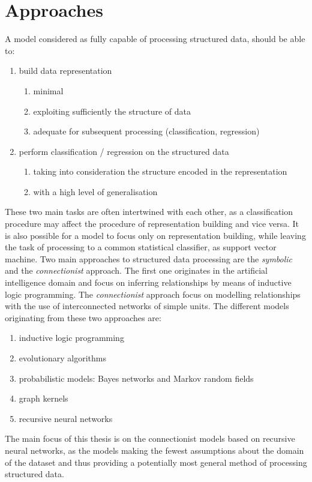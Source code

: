 
\chapter{Approaches}
\noindent A model considered as fully capable of processing structured data, should be able to:
\begin{enumerate}
	\item build data representation
	\begin{enumerate}
		\item minimal
		\item exploiting sufficiently the structure of data
		\item adequate for subsequent processing (classification, regression)
	\end{enumerate}
	\item perform classification / regression on the structured data
	\begin{enumerate}
		\item taking into consideration the structure encoded in the representation
		\item with a high level of generalisation
	\end{enumerate}
\end{enumerate}
These two main tasks are often intertwined with each other, as a classification procedure may affect the procedure of representation building and vice versa. It is also possible for a model to focus only on representation building, while leaving the task of processing to a common statistical classifier, as support vector machine. Two main approaches to structured data processing are the \emph{symbolic} and the \emph{connectionist} approach. The first one originates in the artificial intelligence domain and focus on inferring relationships by means of inductive logic programming. The \emph{connectionist} approach focus on modelling relationships with the use of interconnected networks of simple units. The different models originating from these two approaches are:
\begin{enumerate}
	\item inductive logic programming
	\item evolutionary algorithms
	\item probabilistic models: Bayes networks and Markov random fields
	\item graph kernels
	\item recursive neural networks
\end{enumerate}
The main focus of this thesis is on the connectionist models based on recursive neural networks, as the models making the fewest assumptions about the domain of the dataset and thus providing a potentially most general method of processing structured data.
